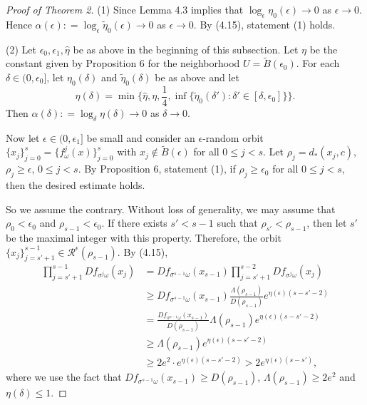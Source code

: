 \documentclass[11pt,oneside]{article}
\theoremstyle{plain}
\numberwithin{equation}{section}
\numberwithin{figure}{section}
\numberwithin{table}{section}
\begin{document}
\begin{proof}[Proof of Theorem 2]

(1) Since Lemma 4.3 implies that $\log_{\epsilon} \eta_0(\epsilon) \to 0$ as $\epsilon \to 0$. Hence $\alpha(\epsilon) : = \log_{\epsilon} \tilde \eta_0(\epsilon) \to 0$ as $\epsilon \to 0$. By (4.15), statement (1) holds.


(2) Let $\epsilon_0, \epsilon_1, \hat \eta$ be as above in the beginning of this subsection. Let $\eta$ be the constant given by Proposition 6 for the neighborhood $U = \tilde B(\epsilon_0)$. For each $\delta \in (0, \epsilon_0]$, let $\eta_0(\delta)$ and $\tilde \eta_0(\delta)$ be as above and let 
\[
\eta(\delta) = \min\{ \hat \eta, \eta, \frac{1}{4}, \inf\{ \tilde \eta_0(\delta') : \delta' \in [ \delta, \epsilon_0] \} \}.
\]
Then $\alpha(\delta) : = \log_{\delta} \eta(\delta) \to 0$ as $\delta \to 0$.


Now let $\epsilon \in (0, \epsilon_1]$ be small and consider an $\epsilon$-random orbit $\{ x_j \}_{j=0}^s = \{ f_{\omega}^j(x) \}_{j=0}^s$ with $x_j \notin \tilde B(\epsilon)$ for all $0 \leq j < s$. Let $\rho_j = d_*(x_j, c)$, $\rho_j \geq \epsilon$, $0 \leq j < s$. By Proposition 6, statement (1), if $\rho_j \geq \epsilon_0$ for all $0 \leq j < s$, then the desired estimate holds. 


So we assume the contrary. Without loss of generality, we may assume that $\rho_0 < \epsilon_0$ and $\rho_{s-1} < \epsilon_0$. If there exists $s' < s-1$ such that $\rho_{s'} < \rho_{s-1}$, then let $s'$ be the maximal integer with this property. Therefore, the orbit $\{ x_j \}_{j=s'+1}^{s-1} \in \mathcal R^{\epsilon}(\rho_{s-1})$. By (4.15),
\begin{align*}
\prod_{j = s'+1}^{s-1} Df_{\sigma^j \omega}(x_j) & = Df_{\sigma^{s-1} \omega}(x_{s-1}) \prod_{j = s'+1}^{s-2} Df_{\sigma^j \omega}(x_j)\\
& \geq Df_{\sigma^{s-1} \omega}(x_{s-1}) \frac{\Lambda(\rho_{s-1})}{D(\rho_{s-1})} e^{\eta(\epsilon) (s - s' -2)}\\
& = \frac{Df_{\sigma^{s-1} \omega}(x_{s-1})}{D(\rho_{s-1})} \Lambda(\rho_{s-1}) e^{\eta(\epsilon) (s - s' -2)}\\ 
& \geq \Lambda(\rho_{s-1}) e^{\eta(\epsilon) (s - s' -2)}\\
& \geq 2 e^2 \cdot e^{\eta(\epsilon) (s - s' -2)} > 2 e^{\eta(\epsilon) (s - s' )},
\end{align*}
where we use the fact that $Df_{\sigma^{s-1} \omega}(x_{s-1}) \geq D(\rho_{s-1})$, $\Lambda(\rho_{s-1}) \geq 2e^2$ and $\eta(\delta) \leq 1$.



\end{proof}
\end{document}
